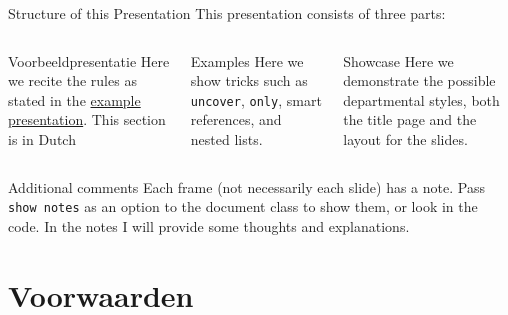 \documentclass[showdate=true, slidenumbers=relative]{beamerruhuisstijl169}
\begin{document}
\begin{frame}{Structure of this Presentation}
    This presentation consists of three parts:
    \begin{columns}[T,totalwidth=\linewidth]
        \begin{column}{0.3\textwidth}
            \begin{block}{Voorbeeldpresentatie}
                Here we recite the rules as stated in the \href{http://www.ru.nl/publish/pages/596464/ru_powerpoint_algemeen_2014_toelichting.ppt}{example presentation}. This section is in Dutch
            \end{block}
        \end{column}
        \begin{column}{0.3\textwidth}
            \begin{block}{Examples}
                Here we show tricks such as \texttt{uncover}, \texttt{only}, smart references, and nested lists.
            \end{block}
        \end{column}
        \begin{column}{0.3\textwidth}
            \begin{block}{Showcase}
                Here we demonstrate the possible departmental styles, both the title page and the layout for the slides.
            \end{block}
        \end{column}
    \end{columns}

    \begin{block}{Additional comments}
        Each frame (not necessarily each slide) has a note. Pass \texttt{show notes} as an option to the document class to show them, or look in the code. In the notes I will provide some thoughts and explanations.
    \end{block}
\end{frame}


\section{Voorwaarden}
\end{document}
